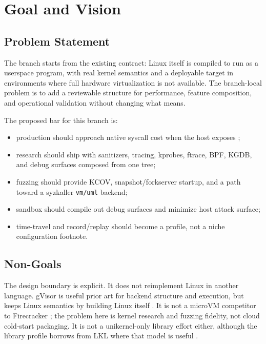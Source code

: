 \section{Goal and Vision}

\subsection{Problem Statement}

The branch starts from the existing \UML{} contract: Linux itself is
compiled to run as a userspace program, with real kernel semantics and
a deployable target in environments where full hardware virtualization
is not available. The branch-local problem is to add a reviewable
structure for performance, feature composition, and operational
validation without changing what \UML{} means.

The proposed bar for this branch is:
\begin{itemize}
  \item production \UML{} should approach native syscall cost when
        the host exposes \KVM{};
  \item research \UML{} should ship with sanitizers, tracing,
        kprobes, ftrace, BPF, KGDB, and debug surfaces composed from
        one tree;
  \item fuzzing \UML{} should provide KCOV, snapshot/forkserver
        startup, and a path toward a syzkaller \texttt{vm/uml}
        backend;
  \item sandbox \UML{} should compile out debug surfaces and minimize
        host attack surface;
  \item time-travel and record/replay should become a profile, not a
        niche configuration footnote.
\end{itemize}

\subsection{Non-Goals}

The design boundary is explicit. It does not reimplement Linux in
another language. gVisor is useful prior art for backend structure and
\KVM{} execution, but \UML{} keeps Linux semantics by building Linux
itself \cite{gvisor-platforms}. It is not a microVM competitor to
Firecracker \cite{firecracker}; the problem here is kernel research
and fuzzing fidelity, not cloud cold-start packaging. It is not a
unikernel-only library effort either, although the library profile
borrows from LKL where that model is useful \cite{lkl}.

